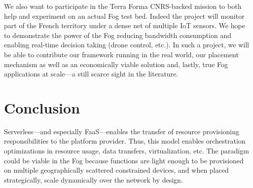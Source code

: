 We also want to participate in the Terra Forma \cite{longuevergne_terra_2022} CNRS-backed mission to both help and experiment on an actual Fog test bed. Indeed the project will monitor part of the French territory under a dense net of multiple \gls{IoT} sensors. We hope to demonstrate the power of the Fog reducing bandwidth consumption and enabling real-time decision taking (drone control, etc.). In such a project, we will be able to contribute our framework running in the real world, our placement mechanism as well as an economically viable solution and, lastly, true Fog applications at scale—a still scarce sight in the literature.

\section{Conclusion}

Serverless—and especially \gls{FaaS}—enables the transfer of resource provisioning responsibilities to the platform provider. Thus, this model enables orchestration optimizations in resource usage, data transfers, virtualization, etc. The paradigm could be viable in the Fog because functions are light enough to be provisioned on multiple geographically scattered constrained devices, and when placed strategically, scale dynamically over the network by design.


